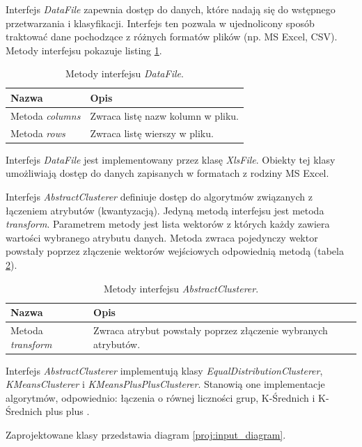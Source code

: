 \documentclass[../thesis.tex]{subfiles}
\begin{document}
Interfejs \emph{DataFile} zapewnia dostęp do danych, które nadają się do wstępnego przetwarzania i klasyfikacji. Interfejs ten pozwala w ujednolicony sposób traktować dane pochodzące z różnych formatów plików (np. MS Excel, CSV). Metody interfejsu pokazuje listing \ref{proj:datafile}.

\begin{table}[h]
\centering
\begin{tabular}{ p{40mm} | p{110mm} }
Nazwa & Opis \\
\hline
Metoda \emph{columns} & Zwraca listę nazw kolumn w pliku. \\
Metoda \emph{rows} & Zwraca listę wierszy w pliku. \\
\end{tabular}
\caption{Metody interfejsu \emph{DataFile}.}
\label{proj:datafile}
\end{table}

Interfejs \emph{DataFile} jest implementowany przez klasę \emph{XlsFile}. Obiekty tej klasy umożliwiają dostęp do danych zapisanych w formatach z rodziny MS Excel. 

Interfejs \emph{AbstractClusterer} definiuje dostęp do algorytmów związanych z łączeniem atrybutów (kwantyzacją). Jedyną metodą interfejsu jest metoda \emph{transform}. Parametrem metody jest lista wektorów z których każdy zawiera wartości wybranego atrybutu danych. Metoda zwraca pojedynczy wektor powstały poprzez złączenie wektorów wejściowych odpowiednią metodą (tabela \ref{proj:abstractclusterer}).

\begin{table}[h]
\centering
\begin{tabular}{ p{40mm} | p{110mm} }
Nazwa & Opis \\
\hline
Metoda \emph{transform} & Zwraca atrybut powstały poprzez złączenie wybranych atrybutów.
\end{tabular}
\caption{Metody interfejsu \emph{AbstractClusterer}.}
\label{proj:abstractclusterer}
\end{table}

Interfejs \emph{AbstractClusterer} implementują klasy \emph{EqualDistributionClusterer}, \emph{KMeansClusterer} i \emph{KMeansPlusPlusClusterer}. Stanowią one implementacje algorytmów, odpowiednio: łączenia o równej liczności grup, K-Średnich i K-Średnich plus plus .

Zaprojektowane klasy przedstawia diagram \ref{proj:input_diagram}.
\end{document}
